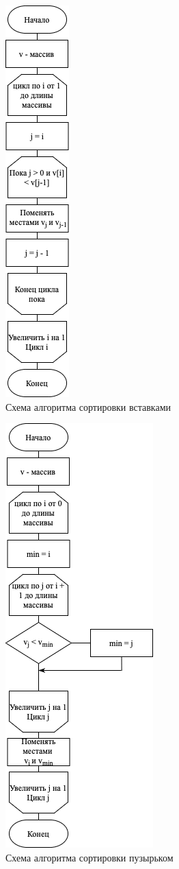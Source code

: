 \documentclass[14pt,russian]{scrartcl}
\begin{document}
\begin{figure}[h]
	\centering
	\includegraphics[scale=1]{insertion.png}
	\caption{Схема алгоритма сортировки вставками}
	\label{fig:insertion}
\end{figure}

\begin{figure}[h]
	\centering
	\includegraphics[scale=1]{selection.png}
	\caption{Схема алгоритма сортировки пузырьком}
	\label{fig:selection}
\end{figure}
\end{document}
